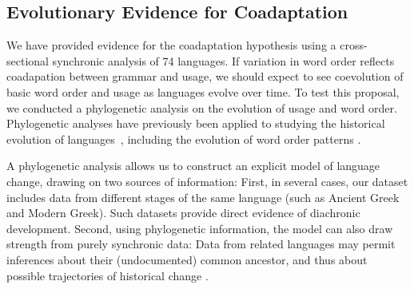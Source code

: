 \documentclass[11pt,a4paper]{article}
\begin{document}



\subsection*{Evolutionary Evidence for Coadaptation}
We have provided evidence for the coadaptation hypothesis using a cross-sectional synchronic analysis of 74 languages.
If variation in word order reflects coadapation between grammar and usage, we should expect to see coevolution of basic word order and usage as languages evolve over time.
To test this proposal, we conducted a phylogenetic analysis on the evolution of usage and word order.
Phylogenetic analyses have previously been applied to studying the historical evolution of languages~\citep[e.g., ][]{gray2009language,greenhill2009austronesian,sagart2019dated}, including the evolution of word order patterns \citep{dunn-evolved-2011, maurits2014tracing}.

A phylogenetic analysis allows us to construct an explicit model of language change, drawing on two sources of information:
First, in several cases, our dataset includes data from different stages of the same language (such as Ancient Greek and Modern Greek).
Such datasets provide direct evidence of diachronic development.
Second, using phylogenetic information, the model can also draw strength from purely synchronic data:
Data from related languages may permit inferences about their (undocumented) common ancestor, and thus about possible trajectories of historical change \citep{pagel2004bayesian, dunn-evolved-2011, maurits2014tracing}.
\end{document}
